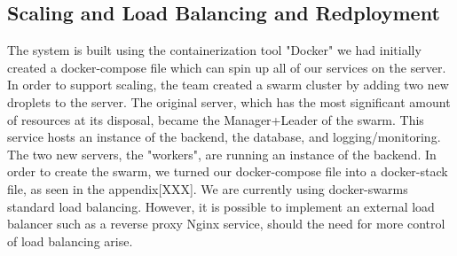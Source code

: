 \subsection{Scaling and Load Balancing and Redployment}

The system is built using the containerization tool "Docker" we had initially created a docker-compose file which can spin up all of our services on the server. In order to support scaling, the team created a swarm cluster by adding two new droplets to the server. The original server, which has the most significant amount of resources at its disposal, became the Manager+Leader of the swarm. This service hosts an instance of the backend, the database, and logging/monitoring. The two new servers, the "workers", are running an instance of the backend. In order to create the swarm, we turned our docker-compose file into a docker-stack file, as seen in the appendix[XXX]. We are currently using docker-swarms standard load balancing. However, it is possible to implement an external load balancer such as a reverse proxy Nginx service, should the need for more control of load balancing arise.